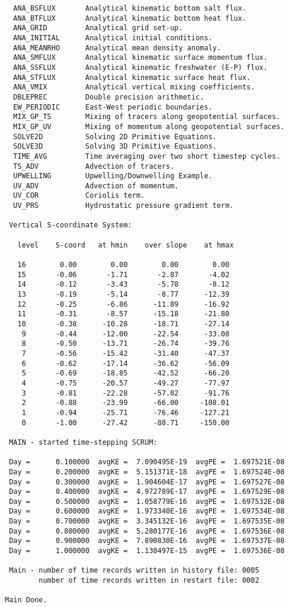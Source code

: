 \begin{verbatim}
  ANA_BSFLUX       Analytical kinematic bottom salt flux.
  ANA_BTFLUX       Analytical kinematic bottom heat flux.
  ANA_GRID         Analytical grid set-up.
  ANA_INITIAL      Analytical initial conditions.
  ANA_MEANRHO      Analytical mean density anomaly.
  ANA_SMFLUX       Analytical kinematic surface momentum flux.
  ANA_SSFLUX       Analytical kinematic freshwater (E-P) flux.
  ANA_STFLUX       Analytical kinematic surface heat flux.
  ANA_VMIX         Analytical vertical mixing coefficients.
  DBLEPREC         Double precision arithmetic.
  EW_PERIODIC      East-West periodic boundaries.
  MIX_GP_TS        Mixing of tracers along geopotential surfaces.
  MIX_GP_UV        Mixing of momentum along geopotential surfaces.
  SOLVE2D          Solving 2D Primitive Equations.
  SOLVE3D          Solving 3D Primitive Equations.
  TIME_AVG         Time averaging over two short timestep cycles.
  TS_ADV           Advection of tracers.
  UPWELLING        Upwelling/Downwelling Example.
  UV_ADV           Advection of momentum.
  UV_COR           Coriolis term.
  UV_PRS           Hydrostatic pressure gradient term.

 Vertical S-coordinate System: 

   level    S-coord   at hmin    over slope    at hmax

   16        0.00        0.00        0.00        0.00
   15       -0.06       -1.71       -2.87       -4.02
   14       -0.12       -3.43       -5.78       -8.12
   13       -0.19       -5.14       -8.77      -12.39
   12       -0.25       -6.86      -11.89      -16.92
   11       -0.31       -8.57      -15.18      -21.80
   10       -0.38      -10.28      -18.71      -27.14
    9       -0.44      -12.00      -22.54      -33.08
    8       -0.50      -13.71      -26.74      -39.76
    7       -0.56      -15.42      -31.40      -47.37
    6       -0.62      -17.14      -36.62      -56.09
    5       -0.69      -18.85      -42.52      -66.20
    4       -0.75      -20.57      -49.27      -77.97
    3       -0.81      -22.28      -57.02      -91.76
    2       -0.88      -23.99      -66.00     -108.01
    1       -0.94      -25.71      -76.46     -127.21
    0       -1.00      -27.42      -88.71     -150.00

 MAIN - started time-stepping SCRUM: 

 Day =      0.100000  avgKE =  7.090495E-19  avgPE =  1.697521E-08
 Day =      0.200000  avgKE =  5.151371E-18  avgPE =  1.697524E-08
 Day =      0.300000  avgKE =  1.904604E-17  avgPE =  1.697527E-08
 Day =      0.400000  avgKE =  4.972789E-17  avgPE =  1.697529E-08
 Day =      0.500000  avgKE =  1.058779E-16  avgPE =  1.697532E-08
 Day =      0.600000  avgKE =  1.973340E-16  avgPE =  1.697534E-08
 Day =      0.700000  avgKE =  3.345132E-16  avgPE =  1.697535E-08
 Day =      0.800000  avgKE =  5.280177E-16  avgPE =  1.697536E-08
 Day =      0.900000  avgKE =  7.890830E-16  avgPE =  1.697537E-08
 Day =      1.000000  avgKE =  1.130497E-15  avgPE =  1.697536E-08

 Main - number of time records written in history file: 0005
        number of time records written in restart file: 0002

Main Done.
\end{verbatim}

